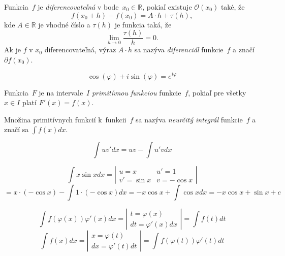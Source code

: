 \begin{definition}[Diferenciál]
	Funkcia~$f$ je {\em diferencovateľná} v bode~$x_0 \in \mathbb{R}$,
	pokiaľ existuje $\mathcal{O}(x_0)$ také, že
	\[
		f(x_0+h)-f(x_0)=A \cdot h + \tau(h),
	\]
	kde $A \in \mathbb{R}$ je vhodné číslo a $\tau(h)$ je funkcia taká, že
	\[
		\lim_{h \to 0} \frac{\tau(h)}{h} = 0.
	\]
	Ak je $f$ v $x_0$ diferencovateľná, výraz $A \cdot h$ sa nazýva 
	{\em diferenciál} funkcie~$f$ a značí $\partial f(x_0)$.
\end{definition}

\begin{theorem}
	\[
		\cos(\varphi) + i \sin(\varphi) = e^{i \varphi}
	\]
\end{theorem}

\begin{definition}
	Funkcia~$F$ je na intervale~$I$ {\em primitívnou funkciou}
	funkcie~$f$, pokiaľ pre všetky $x \in I$ platí $F'(x)=f(x)$.
	
	Množina primitívnych funkcií k~funkcii~$f$ sa nazýva 
	{\em neurčitý integrál} funkcie~$f$ a značí sa $\int f(x) dx$.
\end{definition}

\begin{theorem}
	\[
		\int uv' dx = uv - \int u'v dx
	\]
\end{theorem}

\begin{example}
	\[
		\int x \sin x dx = 
		\left|{\begin{array}{cc}
		  u=x & u'=1 \\
		  v'=\sin x & v = -\cos x
		  \end{array} } \right|
	\]
	\[
		= x \cdot (-\cos x) - \int 1 \cdot (-\cos x)dx = -x \cos x + \int \cos x dx = -x \cos x + \sin x + c
	\]
\end{example}

\begin{theorem}
	\[
		\int f(\varphi(x))\varphi'(x) dx =
		\left|{\begin{array}{c}
		  t = \varphi(x) \\
		  dt = \varphi'(x)dx
		  \end{array} } \right|
		= \int f(t) dt 
	\]
	\[
		\int f(x) dx  =
		\left|{\begin{array}{c}
		  x = \varphi(t) \\
		  dx = \varphi'(t)dt
		  \end{array} } \right|
		= \int f(\varphi(t))\varphi'(t) dt 
	\]
\end{theorem}

